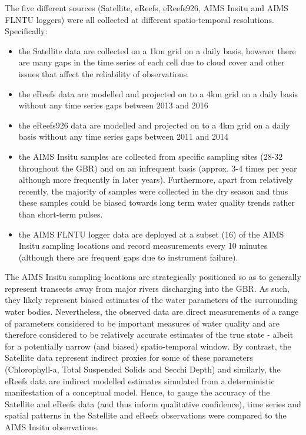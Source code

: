 The five different sources (Satellite, eReefs, eReefs926, AIMS Insitu and AIMS FLNTU loggers) were
all collected at different spatio-temporal resolutions.  Specifically:
\begin{itemize}
\item the Satellite data are collected on a 1km grid on a daily basis, however there are many gaps
in the time series of each cell due to cloud cover and other issues that affect the reliability of
observations.
\item the eReefs data are modelled and projected on to a 4km grid on a daily basis without any time series gaps
between 2013 and 2016
\item the eReefs926 data are modelled and projected  on to a 4km grid on a daily basis without any time series gaps
between 2011 and 2014
\item the AIMS Insitu samples are collected from specific sampling sites (28-32 throughout the GBR)
and on an infrequent basis (approx. 3-4 times per year although more frequently in later years).
Furthermore, apart from relatively recently, the majority of samples were collected in
the dry season and thus these samples could be biased towards long term water quality trends rather
than short-term pulses.
\item the AIMS FLNTU logger data are deployed at a subset (16) of the AIMS Insitu sampling locations
and record measurements every 10 minutes (although there are frequent gaps due to instrument
failure).
\end{itemize}

The AIMS Insitu sampling locations are strategically positioned so as to generally represent
transects away from major rivers discharging into the GBR.  As such, they likely represent biased
estimates of the water parameters of the surrounding water bodies.  Nevertheless, the observed data
are direct measurements of a range of parameters considered to be important measures of water
quality and are therefore considered to be relatively accurate estimates of the true state - albeit
for a potentially narrow (and biased) spatio-temporal window.  By contrast, the Satellite data represent indirect
proxies for some of these parameters (Chlorophyll-a, Total Suspended Solids and Secchi Depth) and
similarly, the eReefs data are indirect modelled estimates simulated from a deterministic
manifestation of a conceptual model.  Hence, to gauge the accuracy of the Satellite and eReefs data
(and thus inform qualitative confidence), time series and spatial patterns in the Satellite and
eReefs observations were compared to the AIMS Insitu observations.
 
